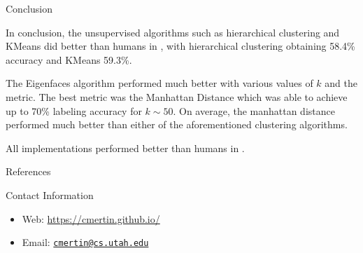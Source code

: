 \documentclass[final]{beamer}
\newlength{\onecolwid}
\begin{document}
\begin{frame}[t]
\begin{columns}[t]
\begin{column}{\onecolwid}
\begin{block}{Conclusion}

In conclusion, the unsupervised algorithms such as hierarchical clustering and KMeans did better than humans in \cite{MormonID}, with hierarchical clustering obtaining 58.4\% accuracy and KMeans 59.3\%. 

The Eigenfaces algorithm performed much better with various values of $k$ and the metric. The best metric was the Manhattan Distance which was able to achieve up to 70\% labeling accuracy for $k \sim 50$. On average, the manhattan distance performed much better than either of the aforementioned clustering algorithms.

All implementations performed better than humans in \cite{MormonID}.

\end{block}


\begin{block}{References}

\nocite{*} %
\small{
\vspace{0.75in}}

\end{block}




\begin{alertblock}{Contact Information}

\begin{itemize}
\item Web: \href{http://cmertin.github.io}{\url{https://cmertin.github.io/}}
\item Email: \href{mailto:cmertin@cs.utah.edu}{\verb~cmertin@cs.utah.edu~}
\end{itemize}


\end{alertblock}
\end{column}
\end{columns}
\end{frame}
\end{document}

